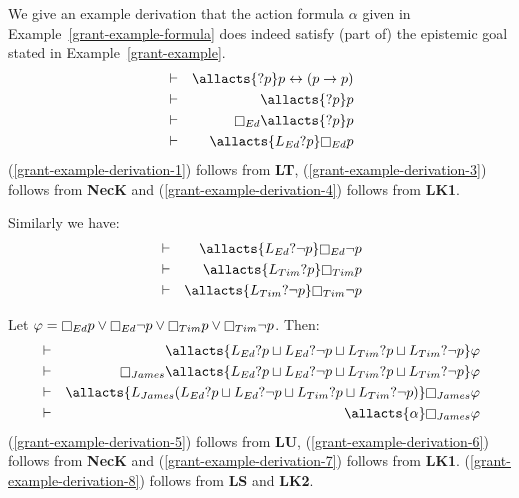 \begin{example}\label{grant-example-derivation}
    We give an example derivation that the action formula $\alpha$ given in Example~\ref{grant-example-formula} does indeed satisfy (part of) the epistemic goal stated in Example~\ref{grant-example}.
    \begin{eqnarray}
        &\proves& \allacts{\test{\atomP}} \atomP \iff (\atomP \implies \atomP)\label{grant-example-derivation-1}\\
        &\proves& \allacts{\test{\atomP}} \atomP\label{grant-example-derivation-2}\\
        &\proves& \necessary[Ed] \allacts{\test{\atomP}} \atomP\label{grant-example-derivation-3}\\
        &\proves& \allacts{\learns_{Ed} \test{\atomP}} \necessary[Ed] \atomP\label{grant-example-derivation-4}
    \end{eqnarray}
    (\ref{grant-example-derivation-1}) follows from {\bf LT},
    (\ref{grant-example-derivation-3}) follows from {\bf NecK} and
    (\ref{grant-example-derivation-4}) follows from {\bf LK1}.

    Similarly we have:
    \begin{eqnarray*}
        &\proves& \allacts{\learns_{Ed} \test{\neg \atomP}} \necessary[Ed] \neg \atomP\\
        &\proves& \allacts{\learns_{Tim} \test{\atomP}} \necessary[Tim] \atomP\\
        &\proves& \allacts{\learns_{Tim} \test{\neg \atomP}} \necessary[Tim] \neg \atomP
    \end{eqnarray*}

    Let $\phi = \necessary[Ed] \atomP \lor  \necessary[Ed] \neg \atomP \lor \necessary[Tim] \atomP \lor \necessary[Tim] \neg \atomP$. Then:
    \begin{eqnarray}
        &\proves& \allacts{\learns_{Ed} \test{\atomP} \choice \learns_{Ed} \test{\neg \atomP} \choice \learns_{Tim} \test{\atomP} \choice \learns_{Tim} \test{\neg \atomP}} \phi\label{grant-example-derivation-5}\\
        &\proves& \necessary[James] \allacts{\learns_{Ed} \test{\atomP} \choice \learns_{Ed} \test{\neg \atomP} \choice \learns_{Tim} \test{\atomP} \choice \learns_{Tim} \test{\neg \atomP}} \phi\label{grant-example-derivation-6}\\
        &\proves& \allacts{\learns_{James} (\learns_{Ed} \test{\atomP} \choice \learns_{Ed} \test{\neg \atomP} \choice \learns_{Tim} \test{\atomP} \choice \learns_{Tim} \test{\neg \atomP})} \necessary[James] \phi\label{grant-example-derivation-7}\\
        &\proves& \allacts{\alpha} \necessary[James] \phi\label{grant-example-derivation-8}
    \end{eqnarray}
    (\ref{grant-example-derivation-5}) follows from {\bf LU},
    (\ref{grant-example-derivation-6}) follows from {\bf NecK} and
    (\ref{grant-example-derivation-7}) follows from {\bf LK1}.
    (\ref{grant-example-derivation-8}) follows from {\bf LS} and {\bf LK2}.


\end{example}

